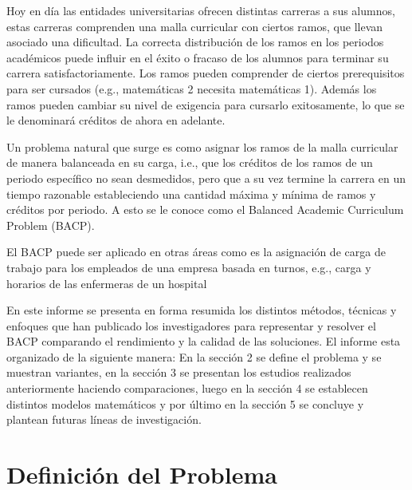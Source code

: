 \documentclass[letterpaper,10pt]{article}
\begin{document}

Hoy en día las entidades universitarias ofrecen distintas carreras a sus alumnos, estas carreras comprenden una malla curricular con ciertos ramos, que llevan asociado una dificultad. La correcta distribución de los ramos en los periodos académicos puede influir en el éxito o fracaso de los alumnos para terminar su carrera satisfactoriamente.
Los ramos pueden comprender de ciertos prerequisitos para ser cursados (e.g., matemáticas 2 necesita matemáticas 1). Además los ramos pueden cambiar su nivel de exigencia para cursarlo exitosamente, lo que se le denominará créditos de ahora en adelante.

Un problema natural que surge es como asignar los ramos de la malla curricular de manera balanceada en su carga, i.e., que los créditos de los ramos de un periodo específico no sean desmedidos, pero que a su vez termine la carrera en un tiempo razonable estableciendo una cantidad máxima y mínima de ramos y créditos por periodo. A esto se le conoce como el Balanced Academic Curriculum Problem (BACP).

El BACP puede ser aplicado en otras áreas como es la asignación de carga de trabajo para los empleados de una empresa basada en turnos, e.g., carga y horarios de las enfermeras de un hospital~\cite{IOPORT.06373100}

En este informe se presenta en forma resumida los distintos métodos, técnicas y enfoques que han publicado los investigadores para representar y resolver el BACP comparando el rendimiento y la calidad de las soluciones. El informe esta organizado de la siguiente manera: En la sección 2 se define el problema y se muestran variantes, en la sección 3 se presentan los estudios realizados anteriormente haciendo comparaciones, luego en la sección 4 se establecen distintos modelos matemáticos y por último en la sección 5 se concluye y plantean futuras líneas de investigación.



\section{Definición del Problema}
\end{document}

